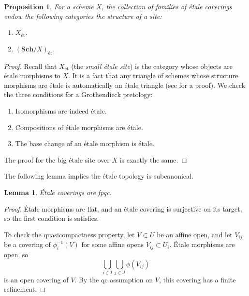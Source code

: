 \documentclass{amsart}
\newcommand{\Sch}{\mathbf{Sch}}
\newtheorem{proposition}[theorem]{Proposition}
\newtheorem{lemma}[theorem]{Lemma}
\theoremstyle{definition}
\theoremstyle{remark}
\begin{document}
\begin{proposition}
    For a scheme $X$, the collection of families of \'etale coverings endow the
    following categories the structure of a site:

    \begin{enumerate}
        \item $X_\text{\'et}$.
        \item $(\Sch/X)_\text{\'et}$.
    \end{enumerate}
\end{proposition}

\begin{proof}
    Recall that $X_\text{\'et}$ (the \textit{small \'etale site}) is the
    category whose objects are \'etale morphisms to $X$. It is a fact that any
    triangle of schemes whose structure morphisms are \'etale is automatically
    an \'etale triangle (see \cite{stacks-project} for a proof). We check the
    three conditions for a Grothendieck pretology:
    \begin{enumerate}
        \item Isomorphisms are indeed \'etale.
        \item Compositions of \'etale morphisms are \'etale.
        \item The base change of an \'etale morphism is \'etale.
    \end{enumerate}

    The proof for the big \'etale site over $X$ is exactly the same.
\end{proof}

The following lemma implies the \'etale topology is subcanonical.

\begin{lemma}
    \'Etale coverings are fpqc.
\end{lemma}

\begin{proof}
    \'Etale morphisms are flat, and an \'etale covering is surjective on its
    target, so the first condition is satisfies.

    To check the quasicompactness property, let $V \subset U$ be an affine open,
    and let $V_{ij}$ be a covering of $\phi_i^{-1}(V)$ for some affine opens
    $V_{ij} \subset U_i$. \'Etale morphisms are open, so
    \[
        \bigcup_{i \in I} \bigcup_{j \in J} \phi(V_{ij})
    \]
    is an open covering of $V$. By the qc assumption on $V$, this covering has a
    finite refinement.
\end{proof}
\end{document}
